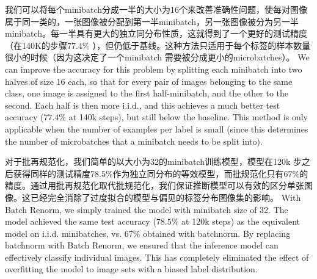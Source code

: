 我们可以将每个minibatch分成一半的大小为16个来改善准确性问题，使每对图像属于同一类的，一张图像被分配到第一半minibatch，另一张图像被分为另一半minibatch。每一半具有更大的独立同分布性质，这就得到了一个更好的测试精度（在140K的步骤$77.4\%$ ），但仍低于基线。这种方法只适用于每个标签的样本数量很小的时候（因为这决定了一个minibatch 需要被分成更小的microbatches）。
We can improve the accuracy for this problem by splitting each minibatch into two halves of size 16 each, so that for every pair of images belonging to the same class, one image is assigned to the first half-minibatch, and the other to the second. Each half is then more i.i.d., and this achieves a much better test accuracy ($77.4\%$ at 140k steps), but still below the baseline. This method is only applicable when the number of examples per label is small (since this determines the number of microbatches that a minibatch needs to be split into).

对于批再规范化，我们简单的以大小为32的minibatch训练模型，模型在120k 步之后获得同样的测试精度$78.5\%$作为独立同分布的等效模型，而批规范化只有$67\%$的精度。通过用批再规范化取代批规范化，我们保证推断模型可以有效的区分单张图像。这已经完全消除了过度拟合的模型与偏见的标签分布图像集的影响。
With Batch Renorm, we simply trained the model with minibatch size of 32. The model achieved the same test accuracy ($78.5\%$ at 120k steps) as the equivalent model on i.i.d. minibatches, vs. $67\%$ obtained with batchnorm. By replacing batchnorm with Batch Renorm, we ensured that the inference model can effectively classify individual images. This has completely eliminated the effect of overfitting the model to image sets with a biased label distribution.


